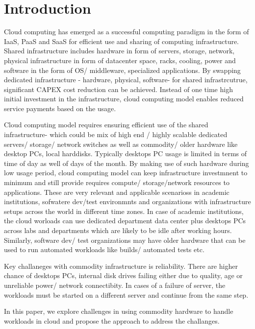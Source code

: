 \documentclass[preprint,9pt]{sigplanconf}
\begin{document}
\section{Introduction}
\label{sec:intro}
\cite{agesen_vmm_benchmarking}
Cloud computing has emerged as a successful computing paradigm in the form of IaaS, PaaS and SaaS for efficient use and sharing of computing infrastructure. Shared infrastructure includes hardware in form of servers, storage, network, physical infrastructure in form of datacenter space, racks, cooling, power and software in the form of OS/ middleware, specialized  applications. By swapping dedicated infrastructure - hardware, physical, software- for shared infrastrcutrue, significant CAPEX cost reduction can be achieved. Instead of one time high initial investment in the infrastructure, cloud computing model enables reduced service payments based on the usage.

Cloud computing model requires ensuring efficient use of the shared infrastructure- which could be mix of high end / highly scalable dedicated servers/ storage/ network switches as well as commodity/ older hardware like desktop PCs, local harddisks. Typically desktops PC usage is limited in terms of time of day as well of days of the month. By making use of such hardware during low usage period, cloud computing model can keep infrastructure investmnent to minimum and still provide requires compute/ storage/network resources to applications. These are very relevant and applicable scenarioss in academic institutions, sofwatere dev/test environmnts and organizations with infrastructure setups across the world in different time zones. In case of academic institutions, the cloud worloads can use dedicated department data center plus desktops PCs across labs and departments which are likely to be idle after working hours. Similarly, software dev/ test organizations may have older hardware that can be used to run automated workloads like builds/ automated tests etc.

Key challaneges with commodity infrastructure is reliability. There are higher chance of desktops PCs, internal disk drives failing either due to quality, age or unreliable power/ network connectibity. In cases of a failure of server, the workloads must be started on a different server and continue from the same step. 

In this paper, we explore challenges in using commodity hardware to handle workloads in cloud and propose the approach to address the challanges.
\end{document}
